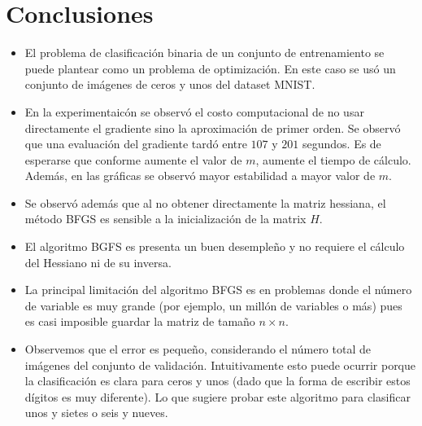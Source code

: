 \documentclass[11pt,letterpaper]{article}
\theoremstyle{definition}
\theoremstyle{definition}
\theoremstyle{definition}
\begin{document}
\section{Conclusiones}
	\begin{itemize}
		\item El problema de clasificación binaria de un conjunto de entrenamiento se puede plantear como un problema de optimización. En este caso se usó un conjunto de imágenes de ceros y unos del dataset MNIST. 
		\item En la experimentaicón se observó el costo computacional de no usar directamente el gradiente sino la aproximación de primer orden. Se observó que una evaluación del gradiente tardó entre $ 107 $ y $ 201 $ segundos. Es de esperarse que conforme aumente el valor de $ m $, aumente el tiempo de cálculo. Además, en las gráficas se observó mayor estabilidad a mayor valor de $ m $.
		\item Se observó además que al no obtener directamente la matriz hessiana, el método BFGS es sensible a la inicialización de la matrix $ H $.
		\item El algoritmo BGFS es presenta un buen desempleño y no requiere el cálculo del Hessiano ni de su inversa.
		\item La principal limitación del algoritmo BFGS es en
		problemas donde el número de variable es muy grande (por ejemplo, un millón de variables o más) pues es casi imposible guardar la matriz de tamaño $ n \times n $.
		\item Observemos que el error es pequeño, considerando el número total de imágenes del conjunto de validación. Intuitivamente esto puede ocurrir porque la clasificación es clara para ceros y unos (dado que la forma de escribir estos dígitos es muy diferente). Lo que sugiere probar este algoritmo para clasificar unos y sietes o seis y nueves.
	\end{itemize}
\end{document}
